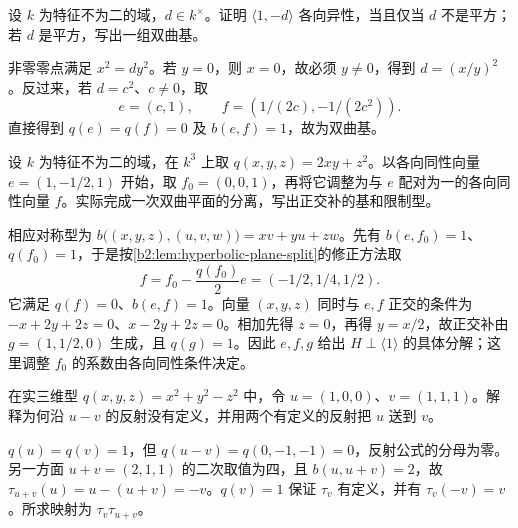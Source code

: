 \begin{exercise}\label{b2:ex:10-binary-isotropy}
	设 \(k\) 为特征不为二的域，\(d\in k^\times\)。证明 \(\langle1,-d\rangle\) 各向异性，当且仅当 \(d\) 不是平方；若 \(d\) 是平方，写出一组双曲基。
\end{exercise}
\begin{solution}
	非零零点满足 \(x^2=dy^2\)。若 \(y=0\)，则 \(x=0\)，故必须 \(y\ne0\)，得到 \(d=(x/y)^2\)。反过来，若 \(d=c^2\)、\(c\ne0\)，取
	\[
		e=(c,1),\qquad f=(1/(2c),-1/(2c^2)).
	\]
	直接得到 \(q(e)=q(f)=0\) 及 \(b(e,f)=1\)，故为双曲基。
\end{solution}

\begin{exercise}\label{b2:ex:10-hyperbolic-split-explicit}
	设 \(k\) 为特征不为二的域，在 \(k^3\) 上取 \(q(x,y,z)=2xy+z^2\)。以各向同性向量 \(e=(1,-1/2,1)\) 开始，取 \(f_0=(0,0,1)\)，再将它调整为与 \(e\) 配对为一的各向同性向量 \(f\)。实际完成一次双曲平面的分离，写出正交补的基和限制型。
\end{exercise}
\begin{solution}
	相应对称型为 \(b\bigl((x,y,z),(u,v,w)\bigr)=xv+yu+zw\)。先有 \(b(e,f_0)=1\)、\(q(f_0)=1\)，于是按\cref{b2:lem:hyperbolic-plane-split}的修正方法取
	\[
		f=f_0-\frac{q(f_0)}2e=(-1/2,1/4,1/2).
	\]
	它满足 \(q(f)=0\)、\(b(e,f)=1\)。向量 \((x,y,z)\) 同时与 \(e,f\) 正交的条件为 \(-x+2y+2z=0\)、\(x-2y+2z=0\)。相加先得 \(z=0\)，再得 \(y=x/2\)，故正交补由 \(g=(1,1/2,0)\) 生成，且 \(q(g)=1\)。因此 \(e,f,g\) 给出 \(H\perp\langle1\rangle\) 的具体分解；这里调整 \(f_0\) 的系数由各向同性条件决定。
\end{solution}

\begin{exercise}\label{b2:ex:10-two-reflections}
	在实三维型 \(q(x,y,z)=x^2+y^2-z^2\) 中，令 \(u=(1,0,0)\)、\(v=(1,1,1)\)。解释为何沿 \(u-v\) 的反射没有定义，并用两个有定义的反射把 \(u\) 送到 \(v\)。
\end{exercise}
\begin{solution}
	\(q(u)=q(v)=1\)，但 \(q(u-v)=q(0,-1,-1)=0\)，反射公式的分母为零。另一方面 \(u+v=(2,1,1)\) 的二次取值为四，且 \(b(u,u+v)=2\)，故 \(\tau_{u+v}(u)=u-(u+v)=-v\)。\(q(v)=1\) 保证 \(\tau_v\) 有定义，并有 \(\tau_v(-v)=v\)。所求映射为 \(\tau_v\tau_{u+v}\)。
\end{solution}

